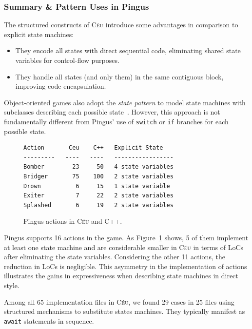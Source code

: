 \documentclass{vgtc}                          %
\newcommand{\CEU}{\textsc{C\'{e}u}\xspace}
\newcommand{\code}[1] {{\small{\texttt{#1}}}}
\begin{document}
\subsubsection{Summary \& Pattern Uses in Pingus}

The structured constructs of \CEU introduce some advantages in comparison to 
explicit state machines:
%
\begin{itemize}
\item They encode all states with direct sequential code, eliminating shared
      state variables for control-flow purposes.
\item They handle all states (and only them) in the same contiguous block,
      improving code encapsulation.
\end{itemize}
%
Object-oriented games also adopt the \emph{state pattern} to model state
machines with subclasses describing each possible state~\cite{games.patterns}.
However, this approach is not fundamentally different from Pingus' use of
\code{switch} or \code{if} branches for each possible state.

\begin{figure}[t]
\begin{verbatim}
Action       Ceu    C++   Explicit State
---------   ----   ----   -----------------
Bomber        23     50   4 state variables
Bridger       75    100   2 state variables
Drown          6     15   1 state variable
Exiter         7     22   2 state variables
Splashed       6     19   2 state variables
\end{verbatim}
\caption{Pingus actions in \CEU and C++.
\label{tab.actions}
}
\end{figure}

Pingus supports 16 actions in the game.
As Figure~\ref{tab.actions} shows, 5 of them implement at least one state
machine and are considerable smaller in \CEU in terms of LoCs after eliminating
the state variables.
%
Considering the other 11 actions, the reduction in LoCs is negligible.
This asymmetry in the implementation of actions illustrates the gains in
expressiveness when describing state machines in direct style.


Among all 65 implementation files in \CEU, we found 29 cases in 25 files using
structured mechanisms to substitute states machines.
They typically manifest as \code{await} statements in sequence.
\end{document}
